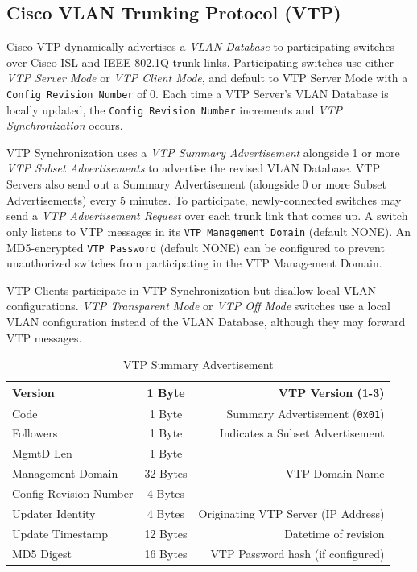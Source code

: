 \documentclass[12pt]{article}
\begin{document}
	\subsection{Cisco VLAN Trunking Protocol (VTP) \label{subsec:CISCO VTP}}
	Cisco VTP dynamically advertises a \textit{VLAN Database} to participating switches over Cisco ISL and IEEE 802.1Q trunk links. Participating switches use either \textit{VTP Server Mode} or \textit{VTP Client Mode}, and default to VTP Server Mode with a \texttt{Config Revision Number} of 0. Each time a VTP Server's VLAN Database is locally updated, the \texttt{Config Revision Number} increments and \textit{VTP Synchronization} occurs.

	VTP Synchronization uses a \textit{VTP Summary Advertisement} alongside 1 or more \textit{VTP Subset Advertisements} to advertise the revised VLAN Database. VTP Servers also send out a Summary Advertisement (alongside 0 or more Subset Advertisements) every 5 minutes. To participate, newly-connected switches may send a \textit{VTP Advertisement Request} over each trunk link that comes up. A switch only listens to VTP messages in its \texttt{VTP Management Domain} (default NONE). An MD5-encrypted \texttt{VTP Password} (default NONE) can be configured to prevent unauthorized switches from participating in the VTP Management Domain.

	VTP Clients participate in VTP Synchronization but disallow local VLAN configurations. \textit{VTP Transparent Mode} or \textit{VTP Off Mode} switches use a local VLAN configuration instead of the VLAN Database, although they may forward VTP messages.

	\begin{table}[H]
	\centering
	\caption{VTP Summary Advertisement \label{tab:VTP SUMMARY}}
	\begin{tabular}{| l | c | r |}
	\hline
	Version				& 1 Byte	& VTP Version (1-3)\\\hline
	Code					& 1 Byte	& Summary Advertisement (\texttt{0x01})\\\hline
	Followers				& 1 Byte	& Indicates a Subset Advertisement\\\hline
	MgmtD Len				& 1 Byte	&\\\hline
	Management Domain		& 32 Bytes	& VTP Domain Name\\\hline
	Config Revision Number	& 4 Bytes	&\\\hline
	Updater Identity			& 4 Bytes	& Originating VTP Server (IP Address)\\\hline
	Update Timestamp		& 12 Bytes	& Datetime of revision\\\hline
	MD5 Digest				& 16 Bytes	& VTP Password hash (if configured)\\\hline
	\end{tabular}\end{table}
\end{document}
